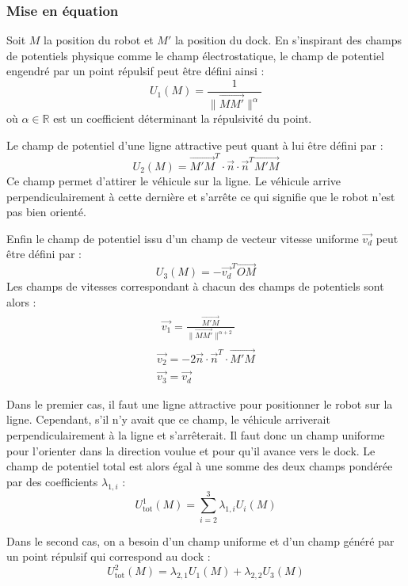 \documentclass[12pt]{report}
\begin{document}
\subsubsection{Mise en équation}

Soit $M$ la position du robot et $M'$ la position du dock. En s'inspirant des champs de potentiels physique comme le champ électrostatique, le champ de potentiel engendré par un point répulsif peut être défini ainsi :
\[ U_1 (M) = \frac{1}{\| \overrightarrow{M M'} \|^{\alpha}} \]
où $\alpha \in \mathbb{R}$ est un coefficient déterminant la répulsivité du point.

Le champ de potentiel d'une ligne attractive peut quant à lui être défini par :
\[ U_2 (M) = \overrightarrow{M' M}^T \cdot \vec{n} \cdot \vec{n}^T \overrightarrow{M' M} \]
Ce champ permet d'attirer le véhicule sur la ligne. Le véhicule arrive perpendiculairement à cette dernière et s'arrête ce qui signifie que le robot n'est pas bien orienté.

Enfin le champ de potentiel issu d'un champ de vecteur vitesse uniforme $\overrightarrow{v_d}$ peut être défini par :
\[ U_3 (M) = - \overrightarrow{v_d}^T \overrightarrow{OM} \]
Les champs de vitesses correspondant à chacun des champs de potentiels sont alors :
\[ \begin{array}{c}
     \begin{array}{c}
       \overrightarrow{v_1} = \frac{\overrightarrow{M' M}}{\| \overrightarrow{M M'} \|^{\alpha + 2}}
     \end{array}\\
     \overrightarrow{v_2} = - 2 \vec{n} \cdot \vec{n}^T \cdot \overrightarrow{M' M}\\
     \overrightarrow{v_3} = \overrightarrow{v_d}
   \end{array} \]


Dans le premier cas, il faut une ligne attractive pour positionner le robot sur la ligne. Cependant, s'il n'y avait que ce champ, le véhicule arriverait perpendiculairement à la ligne et s'arrêterait. Il faut donc un champ uniforme pour l'orienter dans la direction voulue et pour qu'il avance vers le dock. Le champ de potentiel total est alors égal à une somme des deux champs pondérée par des coefficients $\lambda_{1, i}$ :
\[ U^1_{\text{tot}} (M) = \sum_{i = 2}^3 \lambda_{1, i} U_i (M) \]

Dans le second cas, on a besoin d'un champ uniforme et d'un champ généré par un point répulsif qui correspond au dock :
\[ U^2_{\text{tot}} (M) = \lambda_{2, 1} U_1 (M) + \lambda_{2, 2} U_3 (M) \]
\end{document}
